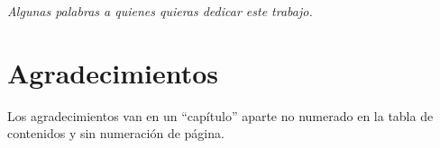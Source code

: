 
\begin{dedication}
\newline
\textit{Algunas palabras a quienes quieras dedicar este trabajo.}
\newline
\end{dedication}

\chapter*{Agradecimientos}
Los agradecimientos van en un ``capítulo'' aparte no numerado en la tabla de contenidos y sin numeración de página.